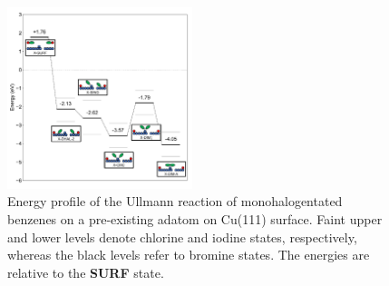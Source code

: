 \documentclass[aps,prb,amsmath,amssymb,11pt]{revtex4-1}
\begin{document}
\begin{figure}[bt]
\centering
\includegraphics[width=0.48\textwidth]{Fig/ullmann_adatom.pdf}
\caption{Energy profile of the Ullmann reaction of monohalogentated benzenes on a pre-existing adatom on Cu(111) surface. Faint upper and lower levels denote chlorine and iodine states, respectively, whereas the black levels refer to bromine states. The energies are relative to the \textbf{SURF} state.}
\label{fig:adatomullmann}
\end{figure}
\end{document}

